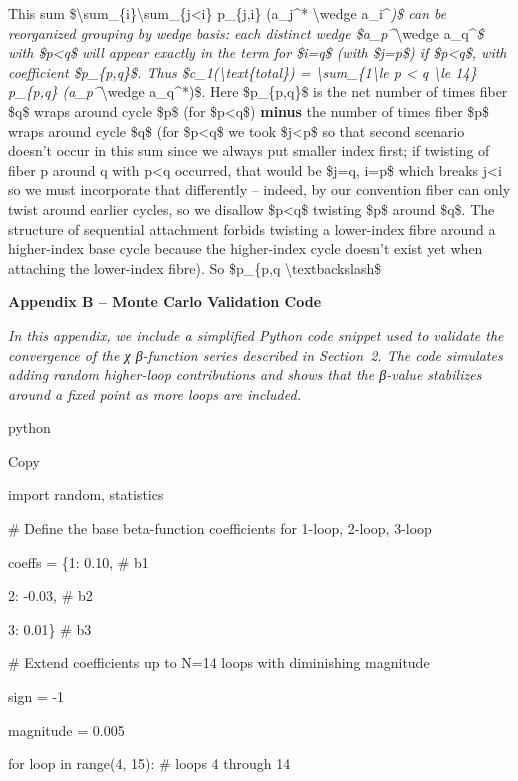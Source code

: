 \documentclass[]{article}
\begin{document}
This sum
\$\textbackslash{}sum\_\{i\}\textbackslash{}sum\_\{j\textless{}i\}
p\_\{j,i\} (a\_j\^{}* \textbackslash{}wedge a\_i\^{}\emph{)\$ can be
reorganized grouping by wedge basis: each distinct wedge
\$a\_p\^{}}\textbackslash{}wedge a\_q\^{}\emph{\$ with \$p\textless{}q\$
will appear exactly in the term for \$i=q\$ (with \$j=p\$) if
\$p\textless{}q\$, with coefficient \$p\_\{p,q\}\$. Thus
\$c\_1(\textbackslash{}text\{total\}) =
\textbackslash{}sum\_\{1\textbackslash{}le p \textless{} q
\textbackslash{}le 14\} p\_\{p,q\} (a\_p\^{}}\textbackslash{}wedge
a\_q\^{}*)\$. Here \$p\_\{p,q\}\$ is the net number of times fiber \$q\$
wraps around cycle \$p\$ (for \$p\textless{}q\$) \textbf{minus} the
number of times fiber \$p\$ wraps around cycle \$q\$ (for
\$p\textless{}q\$ we took \$j\textless{}p\$ so that second scenario
doesn't occur in this sum since we always put smaller index first; if
twisting of fiber p around q with p\textless{}q occurred, that would be
\$j=q, i=p\$ which breaks j\textless{}i so we must incorporate that
differently -- indeed, by our convention fiber can only twist around
earlier cycles, so we disallow \$p\textless{}q\$ twisting \$p\$ around
\$q\$. The structure of sequential attachment forbids twisting a
lower-index fibre around a higher-index base cycle because the
higher-index cycle doesn't exist yet when attaching the lower-index
fibre). So \$p\_\{p,q
\textbackslash{}textbackslash{}\$

\textbf{Appendix B -- Monte Carlo Validation Code}

\emph{In this appendix, we include a simplified Python code snippet used
to validate the convergence of the χ β-function series described in
Section~2. The code simulates adding random higher-loop contributions
and shows that the β-value stabilizes around a fixed point as more loops
are included.}

python

Copy

import random, statistics

\# Define the base beta-function coefficients for 1-loop, 2-loop, 3-loop

coeffs = \{1: 0.10, \# b1

2: -0.03, \# b2

3: 0.01\} \# b3

\# Extend coefficients up to N=14 loops with diminishing magnitude

sign = -1

magnitude = 0.005

for loop in range(4, 15): \# loops 4 through 14
\end{document}
